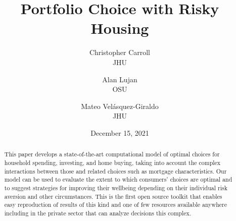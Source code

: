 \documentclass[PortfolioChoiceWithRiskyHousing]{subfiles}
\begin{document}
\providecommand{\versn}{pdf} %
\ifthenelse{\boolean{Web}}{ %
  \renewcommand{\versn}{Web} %
  \providecommand{\rootFromOut}{}
  \renewcommand{\rootFromOut}{.} %
}{} %


\title{Portfolio Choice with Risky Housing}

\author{
  {\small Christopher Carroll\authNum} \\ {\small JHU}
  \and
  {\small Alan Lujan\authNum} \\ {\small OSU}
  \and
  {\small Mateo Vel\'asquez-Giraldo\authNum} \\ {\small JHU}
}



\renewcommand{\forcedate}{December 15, 2021}\date{\forcedate}

\maketitle
\hypertarget{abstract}{}
\begin{abstract}
  This paper develops a state-of-the-art computational model of optimal choices for household spending, investing, and home buying, taking into account the complex interactions between those and related choices such as mortgage characteristics. Our model can be used to evaluate the extent to which consumers' choices are optimal and to suggest strategies for improving their wellbeing depending on their individual risk aversion and other circumstances. This is the first open source toolkit that enables easy reproduction of results of this kind and one of few resources available anywhere including in the private sector that can analyze decisions this complex.  
\end{abstract}
\end{document}
